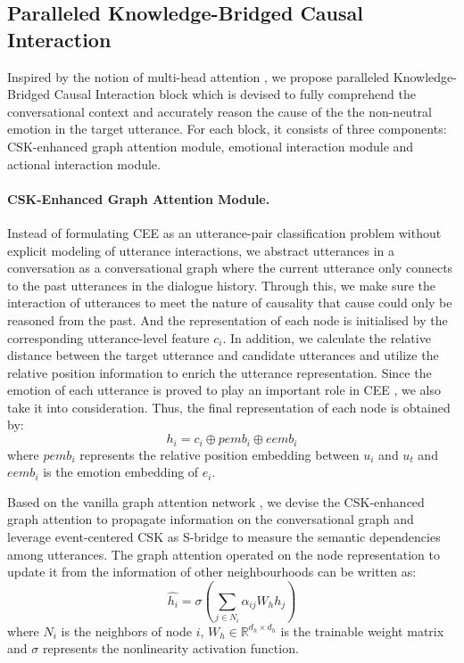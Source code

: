\documentclass[letterpaper]{article} \usepackage{aaai23}  \usepackage{times}  \usepackage{helvet}  \usepackage{courier}  \usepackage[hyphens]{url}  \usepackage{graphicx} \urlstyle{rm} \def\UrlFont{\rm}  \usepackage{natbib}  \usepackage{caption} \frenchspacing  \setlength{\pdfpagewidth}{8.5in} \setlength{\pdfpageheight}{11in} \usepackage{algorithm}
\begin{document}
\subsection{Paralleled Knowledge-Bridged Causal Interaction}
Inspired by the notion of multi-head attention \cite{trans}, we propose paralleled Knowledge-Bridged Causal Interaction block which is devised to fully comprehend the conversational context and accurately reason the cause of the the non-neutral emotion in the target utterance. For each block, it consists of three components: CSK-enhanced graph attention module, emotional interaction module and actional interaction module.

\paragraph{CSK-Enhanced Graph Attention Module.}
Instead of formulating CEE as an utterance-pair classification problem without explicit modeling of utterance interactions, we abstract utterances in a conversation as a conversational graph where the current utterance only connects to the past utterances in the dialogue history. Through this, we make sure the interaction of utterances to meet the nature of causality that cause could only be reasoned from the past. And the representation of each node is initialised by the corresponding utterance-level feature $c_i$. In addition, we calculate the relative distance between the target utterance and candidate utterances and  utilize the relative position information to enrich the utterance representation. Since the emotion of each utterance is proved to play an important role in CEE \cite{reccon}, we also take it into consideration. Thus, the final representation of each node is obtained by: 
\begin{equation}
    h_i = c_i \oplus pemb_i \oplus eemb_i
\end{equation}
where $pemb_i$ represents the relative position embedding between $u_i$ and $u_t$ and $eemb_i$ is the emotion embedding of $e_i$.

Based on the vanilla graph attention network \cite{gat}, we devise the CSK-enhanced graph attention to propagate information on the conversational graph and leverage event-centered CSK as S-bridge to measure the semantic dependencies among utterances. The graph attention operated on the node representation to update it from the information of other neighbourhoods can be written as:
\begin{equation}
    \hat{h_i} = \sigma(\sum_{j \in N_i} \alpha_{ij} W_h h_j)
\end{equation}
where $N_i$ is the neighbors of node $i$, $W_h \in \mathbb{R}^{d_h \times d_h}$ is the trainable weight matrix and $\sigma$ represents the nonlinearity activation function.
\end{document}
